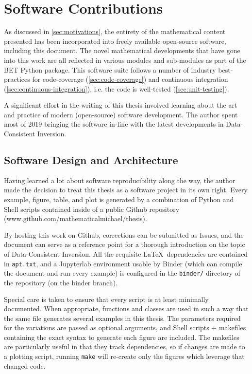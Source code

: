 \section{Software Contributions}\label{sec:software-contributions}

As discussed in \ref{sec:motivations}, the entirety of the mathematical content presented has been incorporated into freely available open-source software, including this document.
The novel mathematical developments that have gone into this work are all reflected in various modules and sub-modules as part of the BET Python package.
This software suite follows a number of industry best-practices for code-coverage (\ref{sec:code-coverage}) and continuous integration (\ref{sec:continuous-integration}), i.e. the code is well-tested (\ref{sec:unit-testing}).

A significant effort in the writing of this thesis involved learning about the art and practice of modern (open-source) software development.
The author spent most of 2019 bringing the software in-line with the latest developments in Data-Consistent Inversion.



\subsection{Software Design and Architecture}\label{sec:architecture}
Having learned a lot about software reproducibility along the way, the author made the decision to treat this thesis as a software project in its own right.
Every example, figure, table, and plot is generated by a combination of Python and Shell scripts contained inside of a public Github repository (www.github.com/mathematicalmichael/thesis).

By hosting this work on Github, corrections can be submitted as Issues, and the document can serve as a reference point for a thorough introduction on the topic of Data-Consistent Inversion.
All the requisite \LaTeX~dependencies are contained in {\tt apt.txt}, and a Jupyterlab environment usable by Binder (which can compile the document and run every example) is configured in the {\tt binder/} directory of the repository (on the binder branch).

Special care is taken to ensure that every script is at least minimally documented.
When appropriate, functions and classes are used in such a way that the same file generates several examples in this thesis.
The parameters required for the variations are passed as optional arguments, and Shell scripts + makefiles containing the exact syntax to generate each figure are included.
The makefiles are particularly useful in that they track dependencies, so if changes are made to a plotting script, running {\tt make} will re-create only the figures which leverage that changed code.


